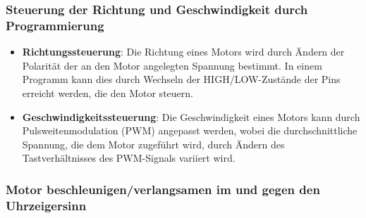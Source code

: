 \documentclass{vorlage-design-main}
\begin{document}
\hypertarget{steuerung-der-richtung-und-geschwindigkeit-durch-programmierung}{%
\subsubsection{Steuerung der Richtung und Geschwindigkeit durch
Programmierung}\label{steuerung-der-richtung-und-geschwindigkeit-durch-programmierung}}

\begin{itemize}

\item
  \textbf{Richtungssteuerung}: Die Richtung eines Motors wird durch
  Ändern der Polarität der an den Motor angelegten Spannung bestimmt. In
  einem Programm kann dies durch Wechseln der HIGH/LOW-Zustände der Pins
  erreicht werden, die den Motor steuern.
\item
  \textbf{Geschwindigkeitssteuerung}: Die Geschwindigkeit eines Motors
  kann durch Pulsweitenmodulation (PWM) angepasst werden, wobei die
  durchschnittliche Spannung, die dem Motor zugeführt wird, durch Ändern
  des Tastverhältnisses des PWM-Signals variiert wird.
\end{itemize}

\hypertarget{motor-beschleunigenverlangsamen-im-und-gegen-den-uhrzeigersinn}{%
\subsubsection{Motor beschleunigen/verlangsamen im und gegen den
Uhrzeigersinn}\label{motor-beschleunigenverlangsamen-im-und-gegen-den-uhrzeigersinn}}
\end{document}
